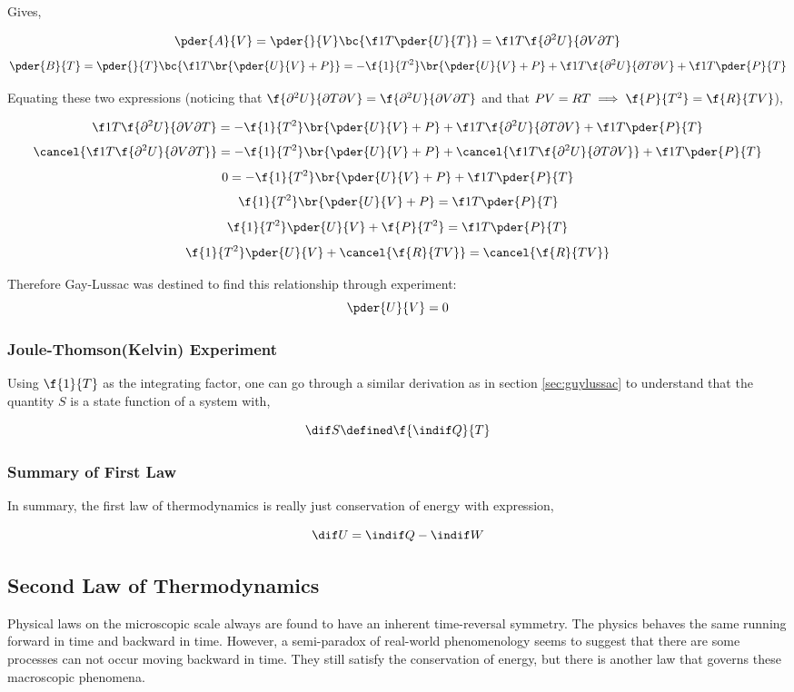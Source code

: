 \documentclass{article}
\begin{document}
Gives,

\[ \pder{A}{V} = \pder{}{V}\bc{\f1T \pder{U}{T}} = \f1T \f{\partial^2 U}{\partial V \partial T} \]
\[ \pder{B}{T} = \pder{}{T}\bc{\f1T \br{\pder{U}{V} + P}} = -\f{1}{T^2} \br{\pder{U}{V} + P} + \f1T \f{\partial^2 U}{\partial T \partial V} + \f1T \pder{P}{T} \]

Equating these two expressions (noticing that $\f{\partial^2 U}{\partial T \partial V} = \f{\partial^2 U}{\partial V \partial T}$ and that $PV = RT \implies \f{P}{T^2} = \f{R}{TV}$),

\[ \f1T \f{\partial^2 U}{\partial V \partial T} = -\f{1}{T^2} \br{\pder{U}{V} + P} + \f1T \f{\partial^2 U}{\partial T \partial V} + \f1T \pder{P}{T} \]
\[ \cancel{\f1T \f{\partial^2 U}{\partial V \partial T}} = -\f{1}{T^2} \br{\pder{U}{V} + P} + \cancel{\f1T \f{\partial^2 U}{\partial T \partial V}} + \f1T \pder{P}{T} \]
\[ 0 = -\f{1}{T^2} \br{\pder{U}{V} + P} + \f1T \pder{P}{T} \]
\[ \f{1}{T^2} \br{\pder{U}{V} + P} = \f1T \pder{P}{T} \]
\[ \f{1}{T^2} \pder{U}{V} + \f{P}{T^2} = \f1T \pder{P}{T} \]
\[ \f{1}{T^2} \pder{U}{V} + \cancel{\f{R}{TV}} = \cancel{\f{R}{TV}} \]

Therefore Gay-Lussac was destined to find this relationship through experiment:
\[ \pder{U}{V} = 0 \]

\subsubsection{Joule-Thomson(Kelvin) Experiment}

Using $\f{1}{T}$ as the integrating factor, one can go through a similar derivation as in section \ref{sec:guylussac} to understand that the quantity $S$ is a state function of a system with,

\[ \dif S \defined \f{\indif Q}{T}  \]

\subsubsection{Summary of First Law}

In summary, the first law of thermodynamics is really just conservation of energy with expression,

\[ \dif U = \indif Q - \indif W \]

\subsection{Second Law of Thermodynamics}

Physical laws on the microscopic scale always are found to have an inherent time-reversal symmetry. The physics behaves the same running forward in time and backward in time. However, a semi-paradox of real-world phenomenology seems to suggest that there are some processes can not occur moving backward in time. They still satisfy the conservation of energy, but there is another law that governs these macroscopic phenomena.
\end{document}
